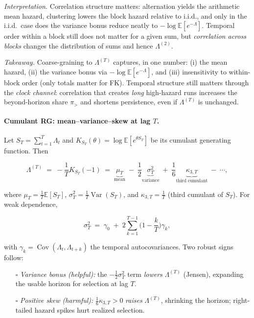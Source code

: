 \documentclass[11pt]{article}
\theoremstyle{upright}
\newcommand{\E}{\mathbb{E}}
\newcommand{\hazT}[1]{\Lambda^{(#1)}}          %
\begin{document}
\medskip
\noindent\textit{Interpretation.}
Correlation structure matters: alternation yields the arithmetic mean hazard,
clustering lowers the block hazard relative to i.i.d., and only in the i.i.d.\ case
does the variance bonus reduce neatly to $-\log\E[e^{-\Lambda}]$.
Temporal order within a block still does not matter for a given sum, but
\emph{correlation across blocks} changes the distribution of sums and hence $\Lambda^{(2)}$.

\medskip
\noindent\textit{Takeaway.}
Coarse-graining to $\hazT{T}$ captures, in one number: (i) the mean hazard, (ii) the variance bonus via $-\log \E[e^{-\Lambda}]$, and (iii) insensitivity to within-block order (only totals matter for FK).
Temporal structure still matters through the \emph{clock channel}: correlation that creates \emph{long} high-hazard runs increases the beyond-horizon share $\pi_{>}$ and shortens persistence, even if $\hazT{T}$ is unchanged.

\paragraph{Cumulant RG: mean–variance–skew at lag $T$.}
Let $S_T=\sum_{t=1}^T \Lambda_t$ and $K_{S_T}(\theta)=\log \mathbb{E}[e^{\theta S_T}]$ be its cumulant generating function. Then

$$
\hazT{T} \;=\; -\frac{1}{T}K_{S_T}(-1)
\;=\;\underbrace{\mu_T}_{\text{mean}} \;-\;\frac{1}{2}\underbrace{\sigma_T^2}_{\text{variance}}\;+\;\frac{1}{6}\underbrace{\kappa_{3,T}}_{\text{third cumulant}}\;-\;\cdots,
$$

where $\mu_T=\frac{1}{T}\mathbb{E}[S_T]$, $\sigma_T^2=\frac{1}{T}\operatorname{Var}(S_T)$, and $\kappa_{3,T}=\frac{1}{T}$ (third cumulant of $S_T$). For weak dependence,

$$
\sigma_T^2 \;=\; \gamma_0 \;+\; 2\sum_{k=1}^{T-1}\Big(1-\frac{k}{T}\Big)\gamma_k,
$$

with $\gamma_k=\operatorname{Cov}(\Lambda_t,\Lambda_{t+k})$ the temporal autocovariances. Two robust signs follow:

\begin{itemize}
\item[$\square$] \emph{Variance bonus (helpful):} the $-\frac{1}{2}\sigma_T^2$ term \emph{lowers} $\hazT{T}$ (Jensen), expanding the usable horizon for selection at lag $T$.
\item[$\square$] \emph{Positive skew (harmful):}  $\frac{1}{6}\kappa_{3,T}>0$ \emph{raises} $\hazT{T}$, shrinking the horizon; right-tailed hazard spikes hurt realized selection.
\end{itemize}
\end{document}
